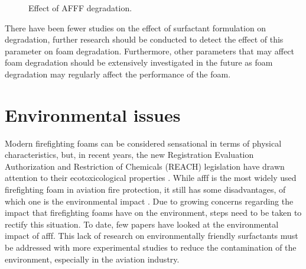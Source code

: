 \begin{figure}[H]

\centering
\begin{adjustbox}{center}
\end{adjustbox}

\caption{Effect of AFFF degradation.}
\label{ch2:figure:effect}
\end{figure}

There have been fewer studies on the effect of surfactant formulation on degradation, further research should be conducted to detect the effect of this parameter on foam degradation. Furthermore, other parameters that may affect foam degradation should be extensively investigated in the future as foam degradation may regularly affect the performance of the foam.

\section{Environmental issues}
Modern firefighting foams can be considered sensational in terms of physical characteristics, but, in recent years, the new Registration Evaluation Authorization and Restriction of Chemicals (REACH) legislation have drawn attention to their ecotoxicological properties \cite{turekova2011environmental}. While \acrshort{afff} is the most widely used firefighting foam in aviation fire protection, it still has some disadvantages, of which one is the environmental impact \cite{zhao2016improving}. Due to growing concerns regarding the impact that firefighting foams have on the environment, steps need to be taken to rectify this situation. To date, few papers have looked at the environmental impact of \acrshort{afff}. This lack of research on environmentally friendly surfactants must be addressed with more experimental studies to reduce the contamination of the environment, especially in the aviation industry. 

